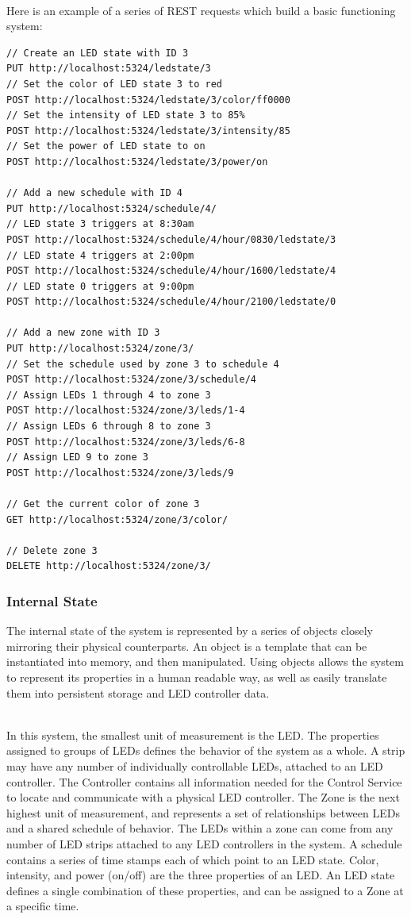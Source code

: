 \documentclass[onecolumn, draftclsnofoot,10pt, compsoc]{IEEEtran}
\begin{document}
			\noindent \\Here is an example of a series of REST requests which build a basic functioning system:
			\begin{lstlisting}[language=XML]
// Create an LED state with ID 3
PUT http://localhost:5324/ledstate/3
// Set the color of LED state 3 to red
POST http://localhost:5324/ledstate/3/color/ff0000
// Set the intensity of LED state 3 to 85%
POST http://localhost:5324/ledstate/3/intensity/85
// Set the power of LED state to on
POST http://localhost:5324/ledstate/3/power/on

// Add a new schedule with ID 4
PUT http://localhost:5324/schedule/4/
// LED state 3 triggers at 8:30am
POST http://localhost:5324/schedule/4/hour/0830/ledstate/3
// LED state 4 triggers at 2:00pm
POST http://localhost:5324/schedule/4/hour/1600/ledstate/4
// LED state 0 triggers at 9:00pm
POST http://localhost:5324/schedule/4/hour/2100/ledstate/0

// Add a new zone with ID 3
PUT http://localhost:5324/zone/3/
// Set the schedule used by zone 3 to schedule 4
POST http://localhost:5324/zone/3/schedule/4
// Assign LEDs 1 through 4 to zone 3
POST http://localhost:5324/zone/3/leds/1-4
// Assign LEDs 6 through 8 to zone 3
POST http://localhost:5324/zone/3/leds/6-8
// Assign LED 9 to zone 3
POST http://localhost:5324/zone/3/leds/9

// Get the current color of zone 3
GET http://localhost:5324/zone/3/color/

// Delete zone 3
DELETE http://localhost:5324/zone/3/
\end{lstlisting}

			\subsubsection{Internal State}
			The internal state of the system is represented by a series of objects closely mirroring their physical counterparts.
			An object is a template that can be instantiated into memory, and then manipulated.
			Using objects allows the system to represent its properties in a human readable way, as well as easily translate them into persistent storage and LED controller data.

			\noindent \\In this system, the smallest unit of measurement is the LED. The properties assigned to groups of LEDs defines the behavior of the system as a whole.
			A strip may have any number of individually controllable LEDs, attached to an LED controller.
			The Controller contains all information needed for the Control Service to locate and communicate with a physical LED controller.
			The Zone is the next highest unit of measurement, and represents a set of relationships between LEDs and a shared schedule of behavior.
			The LEDs within a zone can come from any number of LED strips attached to any LED controllers in the system.
			A schedule contains a series of time stamps each of which point to an LED state.
			Color, intensity, and power (on/off) are the three properties of an LED. An LED state defines a single combination of these properties, and can be assigned to a Zone at a specific time.
\end{document}
